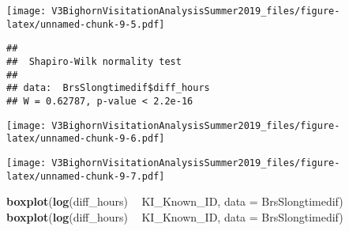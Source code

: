 \documentclass[]{article}
\newenvironment{Shaded}{\begin{snugshade}}{\end{snugshade}}
\newcommand{\CommentTok}[1]{\textcolor[rgb]{0.56,0.35,0.01}{\textit{#1}}}
\newcommand{\DataTypeTok}[1]{\textcolor[rgb]{0.13,0.29,0.53}{#1}}
\newcommand{\KeywordTok}[1]{\textcolor[rgb]{0.13,0.29,0.53}{\textbf{#1}}}
\newcommand{\NormalTok}[1]{#1}
\newcommand{\OperatorTok}[1]{\textcolor[rgb]{0.81,0.36,0.00}{\textbf{#1}}}
\newcommand{\StringTok}[1]{\textcolor[rgb]{0.31,0.60,0.02}{#1}}
\begin{document}
\begin{Shaded}
\end{Shaded}

\texttt{[image: V3BighornVisitationAnalysisSummer2019\_files/figure-latex/unnamed-chunk-9-5.pdf]}

\begin{Shaded}
\end{Shaded}

\begin{verbatim}
## 
##  Shapiro-Wilk normality test
## 
## data:  BrsSlongtimedif$diff_hours
## W = 0.62787, p-value < 2.2e-16
\end{verbatim}

\begin{Shaded}
\end{Shaded}

\texttt{[image: V3BighornVisitationAnalysisSummer2019\_files/figure-latex/unnamed-chunk-9-6.pdf]}

\begin{Shaded}
\end{Shaded}

\texttt{[image: V3BighornVisitationAnalysisSummer2019\_files/figure-latex/unnamed-chunk-9-7.pdf]}

\begin{Shaded}
\begin{Highlighting}[]
\KeywordTok{boxplot}\NormalTok{(}\KeywordTok{log}\NormalTok{(diff_hours) }\OperatorTok{~}\StringTok{ }\NormalTok{KI_Known_ID, }\DataTypeTok{data =}\NormalTok{ BrsSlongtimedif)}
\KeywordTok{boxplot}\NormalTok{(}\KeywordTok{log}\NormalTok{(diff_hours) }\OperatorTok{~}\StringTok{ }\NormalTok{KI_Known_ID, }\DataTypeTok{data =}\NormalTok{ BrsSlongtimedif)}
\end{Highlighting}
\end{Shaded}
\end{document}
